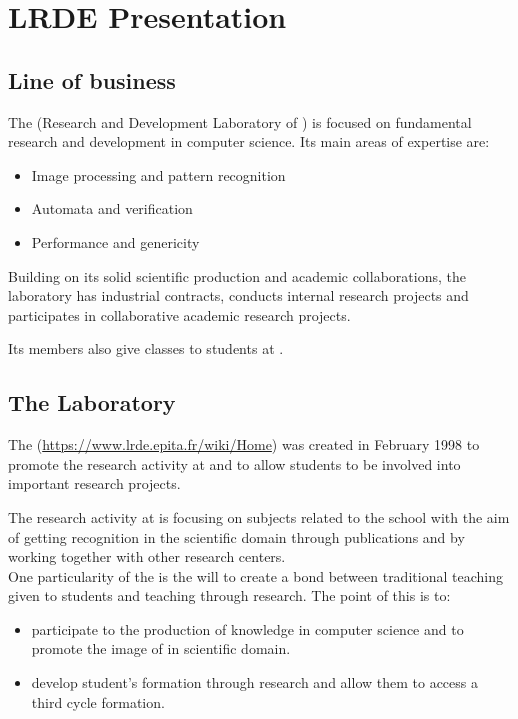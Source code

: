 \chapter{LRDE Presentation}


\section{Line of business}
The \LRDE\space (Research and Development Laboratory of \EPITA) is focused on fundamental
research and development in computer science. Its main areas of expertise are:
\begin{itemize}
 \item Image processing and pattern recognition
 \item Automata and verification
 \item Performance and genericity
\end{itemize}


\noindent Building on its solid scientific production and academic collaborations, the laboratory has
industrial contracts, conducts internal research projects and participates in collaborative
academic research projects.

\noindent Its members also give classes to students at \EPITA.

\section{The Laboratory}
The \LRDE\space (\url{https://www.lrde.epita.fr/wiki/Home}) was created in February 1998 to promote
the research activity at \EPITA\space and to allow students to be involved into important research
projects.

The research activity at \LRDE\space is focusing on subjects related to the school with the aim
of getting recognition in the scientific domain through publications and by working together with other
research centers.\\
One particularity of the \LRDE\space is the will to create a bond between traditional
teaching given to \EPITA\space students and teaching through research. The point of this is to:
\begin{itemize}
  \item participate to the production of knowledge in computer science and to
	promote the image of \EPITA\space in scientific domain.
  \item develop \LRDE\space student's formation through research and allow them to access a third cycle
	formation.
\end{itemize}


